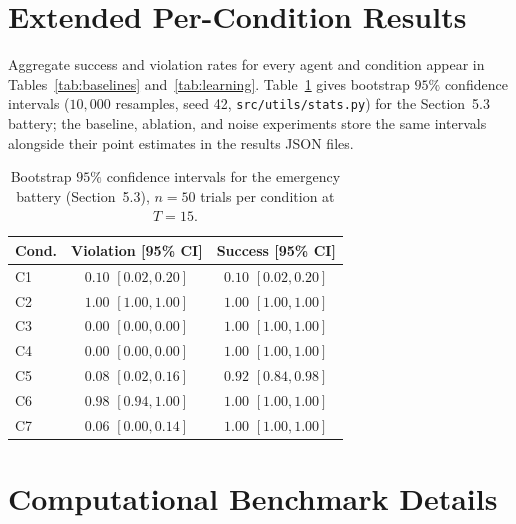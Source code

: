 \documentclass[10pt,twocolumn]{article}
\begin{document}
\section{Extended Per-Condition Results}
\label{app:results}

Aggregate success and violation rates for every agent and condition appear in Tables~\ref{tab:baselines} and~\ref{tab:learning}. Table~\ref{tab:app-cis} gives bootstrap $95\%$ confidence intervals ($10{,}000$ resamples, seed 42, \texttt{src/utils/stats.py}) for the Section~5.3 battery; the baseline, ablation, and noise experiments store the same intervals alongside their point estimates in the results JSON files.

\begin{table}[H]
\centering
\scriptsize
\begin{tabular}{lcc}
\toprule
\textbf{Cond.} & \textbf{Violation [95\% CI]} & \textbf{Success [95\% CI]} \\ \midrule
C1 & $0.10$ $[0.02, 0.20]$ & $0.10$ $[0.02, 0.20]$ \\
C2 & $1.00$ $[1.00, 1.00]$ & $1.00$ $[1.00, 1.00]$ \\
C3 & $0.00$ $[0.00, 0.00]$ & $1.00$ $[1.00, 1.00]$ \\
C4 & $0.00$ $[0.00, 0.00]$ & $1.00$ $[1.00, 1.00]$ \\
C5 & $0.08$ $[0.02, 0.16]$ & $0.92$ $[0.84, 0.98]$ \\
C6 & $0.98$ $[0.94, 1.00]$ & $1.00$ $[1.00, 1.00]$ \\
C7 & $0.06$ $[0.00, 0.14]$ & $1.00$ $[1.00, 1.00]$ \\ \bottomrule
\end{tabular}
\caption{Bootstrap $95\%$ confidence intervals for the emergency battery (Section~5.3), $n = 50$ trials per condition at $T = 15$.}
\label{tab:app-cis}
\end{table}

\section{Computational Benchmark Details}
\label{app:bench}
\end{document}
